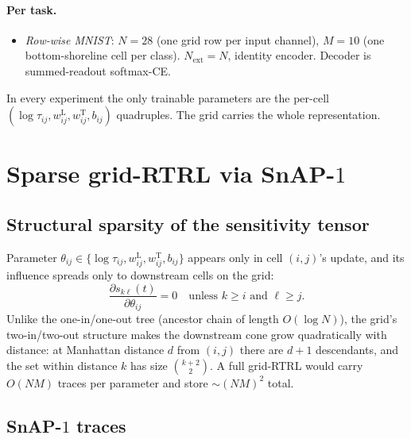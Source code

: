 \documentclass[11pt]{article}
\begin{document}
\paragraph{Per task.}
\begin{itemize}[leftmargin=*]
\item \textit{Row-wise MNIST}: $N{=}28$ (one grid row per input
channel), $M{=}10$ (one bottom-shoreline cell per class). $N_{\text{ext}}
= N$, identity encoder. Decoder is summed-readout softmax-CE.
\end{itemize}

In every experiment the only trainable parameters are the per-cell
$(\log\tau_{ij}, w_{ij}^\text{L}, w_{ij}^\text{T}, b_{ij})$ quadruples.
The grid carries the whole representation.

\section{Sparse grid-RTRL via SnAP-$1$}
\label{sec:snap}

\subsection{Structural sparsity of the sensitivity tensor}

Parameter $\theta_{ij} \in \{\log\tau_{ij}, w_{ij}^\text{L},
w_{ij}^\text{T}, b_{ij}\}$ appears only in cell $(i, j)$'s update, and
its influence spreads only to downstream cells on the grid:
\begin{equation}
\frac{\partial s_{k\ell}(t)}{\partial \theta_{ij}} = 0
\quad\text{unless } k \ge i \text{ and } \ell \ge j.
\end{equation}
Unlike the one-in/one-out tree (ancestor chain of length $O(\log N)$),
the grid's two-in/two-out structure makes the downstream cone grow
quadratically with distance: at Manhattan distance $d$ from
$(i, j)$ there are $d{+}1$ descendants, and the set within distance
$k$ has size $\binom{k+2}{2}$. A full grid-RTRL would carry $O(NM)$
traces per parameter and store $\sim\!(NM)^2$ total.

\subsection{SnAP-$1$ traces}
\end{document}
